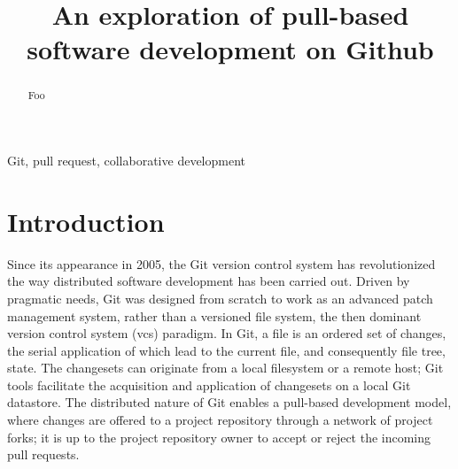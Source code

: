 \documentclass[conference]{IEEEtran}
\begin{document}
\title{An exploration of pull-based software development on Github}

\author{
}

\maketitle

\begin{abstract}
Foo
\end{abstract}

\begin{IEEEkeywords}
Git, pull request, collaborative development
\end{IEEEkeywords}

\section{Introduction}

Since its appearance in 2005, the Git version control system has revolutionized
the way distributed software development has been carried out. Driven by
pragmatic needs, Git was designed from scratch to work as an advanced patch
management system, rather than a versioned file system, the then dominant
version control system ({\sc vcs}) paradigm. In Git, a file is an ordered set of
changes, the serial application of which lead to the current file, and
consequently file tree, state. The changesets can originate from a local
filesystem or a remote host; Git tools facilitate the acquisition and
application of changesets on a local Git datastore. The distributed nature
of Git enables a pull-based development model, where changes are offered
to a project repository through a network of project forks; it is up to the
project repository owner to accept or reject the incoming pull requests.
\end{document}
